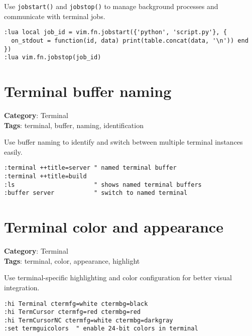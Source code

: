 {{{{{{{{{{Use {\footnotesize \Verb§jobstart()§} and {\footnotesize \Verb§jobstop()§} to manage background processes and communicate with terminal jobs.

\begin{Exa*}{}
\begin{Verbatim}[fontsize=\footnotesize, breaklines, breakanywhere]
:lua local job_id = vim.fn.jobstart({'python', 'script.py'}, {
  on_stdout = function(id, data) print(table.concat(data, '\n')) end
})
:lua vim.fn.jobstop(job_id)
\end{Verbatim}
\end{Exa*}

\section{Terminal buffer naming}

\textbf{Category}: Terminal\\ \textbf{Tags}: terminal, buffer, naming, identification
\vspace{0.5cm}

Use buffer naming to identify and switch between multiple terminal instances easily.

\begin{Exa*}{}
\begin{Verbatim}[fontsize=\footnotesize, breaklines, breakanywhere]
:terminal ++title=server " named terminal buffer
:terminal ++title=build
:ls                      " shows named terminal buffers
:buffer server           " switch to named terminal
\end{Verbatim}
\end{Exa*}

\section{Terminal color and appearance}

\textbf{Category}: Terminal\\ \textbf{Tags}: terminal, color, appearance, highlight
\vspace{0.5cm}

Use terminal-specific highlighting and color configuration for better visual integration.

\begin{Exa*}{}
\begin{Verbatim}[fontsize=\footnotesize, breaklines, breakanywhere]
:hi Terminal ctermfg=white ctermbg=black
:hi TermCursor ctermfg=red ctermbg=red
:hi TermCursorNC ctermfg=white ctermbg=darkgray
:set termguicolors  " enable 24-bit colors in terminal
\end{Verbatim}
\end{Exa*}

}}}}}}}}}}
